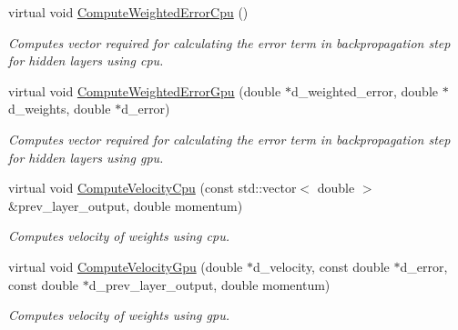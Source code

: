 \begin{DoxyCompactItemize}
virtual void \hyperlink{classneuralnet_1_1Layer_acfda6fbba248fc0bc9bebbc138e12092}{Compute\+Weighted\+Error\+Cpu} ()
\begin{DoxyCompactList}\small\item\em Computes vector required for calculating the error term in backpropagation step for hidden layers using cpu. \end{DoxyCompactList}\item 
virtual void \hyperlink{classneuralnet_1_1Layer_a2990b68f97c1027baa9fdd718ed04591}{Compute\+Weighted\+Error\+Gpu} (double $\ast$d\+\_\+weighted\+\_\+error, double $\ast$d\+\_\+weights, double $\ast$d\+\_\+error)
\begin{DoxyCompactList}\small\item\em Computes vector required for calculating the error term in backpropagation step for hidden layers using gpu. \end{DoxyCompactList}\item 
virtual void \hyperlink{classneuralnet_1_1Layer_a7a2716aec90e66d785acd202b297b4bb}{Compute\+Velocity\+Cpu} (const std\+::vector$<$ double $>$ \&prev\+\_\+layer\+\_\+output, double momentum)
\begin{DoxyCompactList}\small\item\em Computes velocity of weights using cpu. \end{DoxyCompactList}\item 
virtual void \hyperlink{classneuralnet_1_1Layer_a50fdc0a7f0702795eacf02b29c54f2b0}{Compute\+Velocity\+Gpu} (double $\ast$d\+\_\+velocity, const double $\ast$d\+\_\+error, const double $\ast$d\+\_\+prev\+\_\+layer\+\_\+output, double momentum)
\begin{DoxyCompactList}\small\item\em Computes velocity of weights using gpu. \end{DoxyCompactList}\end{DoxyCompactItemize}
